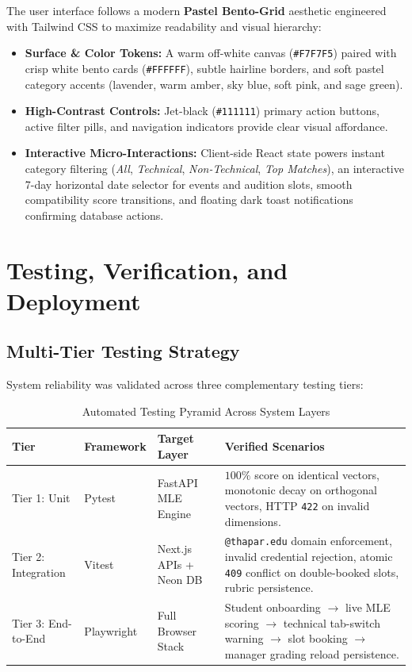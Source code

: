 \documentclass[12pt,a4paper]{report}
\begin{document}
The user interface follows a modern \textbf{Pastel Bento-Grid} aesthetic engineered with Tailwind CSS to maximize readability and visual hierarchy:
\begin{itemize}[noitemsep]
    \item \textbf{Surface \& Color Tokens:} A warm off-white canvas (\texttt{\#F7F7F5}) paired with crisp white bento cards (\texttt{\#FFFFFF}), subtle hairline borders, and soft pastel category accents (lavender, warm amber, sky blue, soft pink, and sage green).
    \item \textbf{High-Contrast Controls:} Jet-black (\texttt{\#111111}) primary action buttons, active filter pills, and navigation indicators provide clear visual affordance.
    \item \textbf{Interactive Micro-Interactions:} Client-side React state powers instant category filtering (\textit{All}, \textit{Technical}, \textit{Non-Technical}, \textit{Top Matches}), an interactive 7-day horizontal date selector for events and audition slots, smooth compatibility score transitions, and floating dark toast notifications confirming database actions.
\end{itemize}

\chapter{Testing, Verification, and Deployment}

\section{Multi-Tier Testing Strategy}
System reliability was validated across three complementary testing tiers:

\begin{table}[H]
\centering
\renewcommand{\arraystretch}{1.25}
\begin{tabularx}{\textwidth}{@{}l l l X@{}}
\toprule
\textbf{Tier} & \textbf{Framework} & \textbf{Target Layer} & \textbf{Verified Scenarios} \\
\midrule
Tier 1: Unit & Pytest & FastAPI MLE Engine & $100\%$ score on identical vectors, monotonic decay on orthogonal vectors, HTTP \texttt{422} on invalid dimensions. \\
Tier 2: Integration & Vitest & Next.js APIs + Neon DB & \texttt{@thapar.edu} domain enforcement, invalid credential rejection, atomic \texttt{409} conflict on double-booked slots, rubric persistence. \\
Tier 3: End-to-End & Playwright & Full Browser Stack & Student onboarding $\rightarrow$ live MLE scoring $\rightarrow$ technical tab-switch warning $\rightarrow$ slot booking $\rightarrow$ manager grading reload persistence. \\
\bottomrule
\end{tabularx}
\caption{Automated Testing Pyramid Across System Layers}
\end{table}
\end{document}
